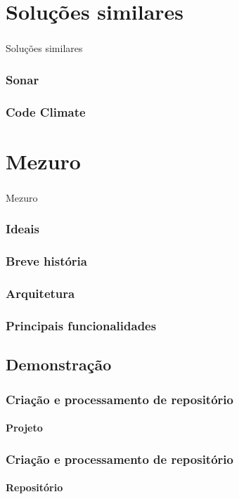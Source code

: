 \documentclass{beamer}
\begin{document}
\section{Soluções similares}
\begin{frame}
  \frametitle{}
  \framesubtitle{}

  Soluções similares
\end{frame}

\begin{frame}
  \frametitle{Sonar}
  \framesubtitle{}
\end{frame}

\begin{frame}
  \frametitle{Code Climate}
  \framesubtitle{}
\end{frame}

\section{Mezuro}
\begin{frame}
  \frametitle{}
  \framesubtitle{}

  Mezuro
\end{frame}

\begin{frame}
  \frametitle{Ideais}
  \framesubtitle{}
\end{frame}

\begin{frame}
  \frametitle{Breve história}
  \framesubtitle{}
\end{frame}

\begin{frame}
  \frametitle{Arquitetura}
  \framesubtitle{}
\end{frame}

\begin{frame}
  \frametitle{Principais funcionalidades}
  \framesubtitle{}
\end{frame}

  \subsection{Demonstração}
  \begin{frame}
    \frametitle{Criação e processamento de repositório}
    \framesubtitle{Projeto}
  \end{frame}

  \begin{frame}
    \frametitle{Criação e processamento de repositório}
    \framesubtitle{Repositório}
  \end{frame}
\end{document}
